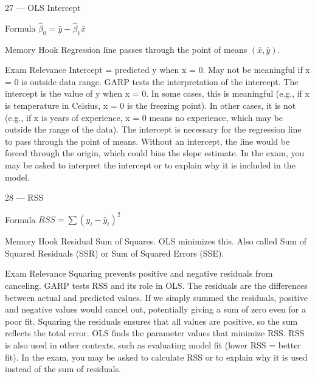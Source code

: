 \documentclass[aspectratio=169,8pt]{beamer}
\begin{document}
	\begin{frame}{27 --- OLS Intercept}
		\begin{block}{Formula}
			$\hat{\beta}_0 = \bar{y} - \hat{\beta}_1\bar{x}$
		\end{block}
		\begin{block}{Memory Hook}
			Regression line passes through the point of means $(\bar{x}, \bar{y})$.
		\end{block}
		\begin{block}{Exam Relevance}
			Intercept = predicted y when x = 0. May not be meaningful if x = 0 is outside data range. GARP tests the interpretation of the intercept. The intercept is the value of y when x = 0. In some cases, this is meaningful (e.g., if x is temperature in Celsius, x = 0 is the freezing point). In other cases, it is not (e.g., if x is years of experience, x = 0 means no experience, which may be outside the range of the data). The intercept is necessary for the regression line to pass through the point of means. Without an intercept, the line would be forced through the origin, which could bias the slope estimate. In the exam, you may be asked to interpret the intercept or to explain why it is included in the model.
		\end{block}
	\end{frame}
	
	\begin{frame}{28 --- RSS}
		\begin{block}{Formula}
			$RSS = \sum(y_i - \hat{y}_i)^2$
		\end{block}
		\begin{block}{Memory Hook}
			Residual Sum of Squares. OLS minimizes this. Also called Sum of Squared Residuals (SSR) or Sum of Squared Errors (SSE).
		\end{block}
		\begin{block}{Exam Relevance}
			Squaring prevents positive and negative residuals from canceling. GARP tests RSS and its role in OLS. The residuals are the differences between actual and predicted values. If we simply summed the residuals, positive and negative values would cancel out, potentially giving a sum of zero even for a poor fit. Squaring the residuals ensures that all values are positive, so the sum reflects the total error. OLS finds the parameter values that minimize RSS. RSS is also used in other contexts, such as evaluating model fit (lower RSS = better fit). In the exam, you may be asked to calculate RSS or to explain why it is used instead of the sum of residuals.
		\end{block}
	\end{frame}
	
\end{document}
